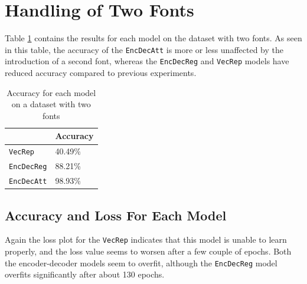 
\section{Handling of Two Fonts}
\label{sec:handling_of_two_fonts}
Table \ref{table:accuracy_two_fonts} contains the results for each model on the dataset with two fonts. As seen in this table, the accuracy of the {\tt EncDecAtt} is more or less unaffected by the introduction of a second font, whereas the {\tt EncDecReg} and {\tt VecRep} models have reduced accuracy compared to previous experiments. 

\begin{table}[H]
    \centering
    \begin{tabular}{|l|l|}
        \hline 
                                        & \textbf{Accuracy}         \\ \hline
        {\tt VecRep }                   & 40.49\%                   \\ \hline
        {\tt EncDecReg}                 & 88.21\%                   \\ \hline
        {\tt EncDecAtt}                 & 98.93\%                   \\ \hline
    \end{tabular}
    \caption{Accuracy for each model on a dataset with two fonts}
    \label{table:accuracy_two_fonts}
\end{table}

\subsection{Accuracy and Loss For Each Model}

Again the loss plot for the {\tt VecRep} indicates that this model is unable to learn properly, and the loss value seems to worsen after a few couple of epochs. Both the encoder-decoder models seem to overfit, although the {\tt EncDecReg} model overfits significantly after about 130 epochs.

